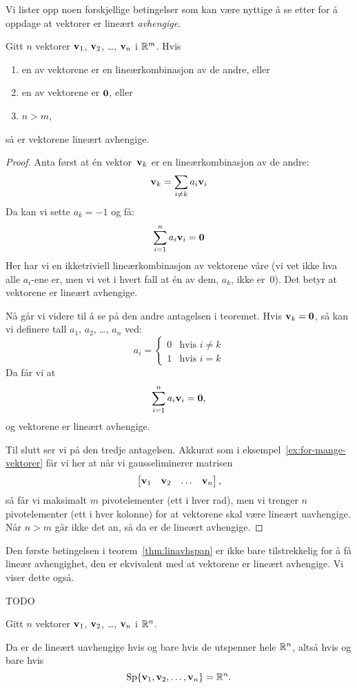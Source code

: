 Vi lister opp noen forskjellige betingelser som kan være nyttige å se
etter for å oppdage at vektorer er lineært \emph{avhengige}.

\begin{thm}
\label{thm:linavhspan}
Gitt $n$ vektorer  $\mathbf{v}_1$, $\mathbf{v}_2$, \ldots, $\mathbf{v}_n$ i $\mathbb{R}^m$.  Hvis
\begin{enumerate}
\item en av vektorene er en lineærkombinasjon av de andre, eller
\item en av vektorene er $\mathbf{0}$, eller
\item $n > m$,
\end{enumerate}
så er vektorene lineært avhengige.
\end{thm}
\begin{proof}
Anta først at én vektor~$\mathbf{v}_k$ er en lineærkombinasjon av de andre:
\[
\mathbf{v}_k = \sum_{i \ne k} a_i \mathbf{v}_i
\]
Da kan vi sette $a_k = -1$ og få:
\[
\sum_{i = 1}^n a_i \mathbf{v}_i = \mathbf{0}
\]
Her har vi en ikketriviell lineærkombinasjon av vektorene våre (vi vet
ikke hva alle $a_i$-ene er, men vi vet i hvert fall at én av dem,
$a_k$, ikke er~$0$).  Det betyr at vektorene er lineært avhengige.

Nå går vi videre til å se på den andre antagelsen i teoremet.  Hvis
$\mathbf{v}_k = \mathbf{0}$, så kan vi definere tall $a_1$, $a_2$, \ldots, $a_n$
ved:
\[
a_i =
\begin{cases}
0 & \text{hvis $i \ne k$} \\
1 & \text{hvis $i = k$}
\end{cases}
\]
Da får vi at
\[
\sum_{i = 1}^n a_i \mathbf{v}_i = \mathbf{0},
\]
og vektorene er lineært avhengige.

Til slutt ser vi på den tredje antagelsen.  Akkurat som i
eksempel~\ref{ex:for-mange-vektorer} får vi her at når vi
gausseliminerer matrisen
\[
\begin{bmatrix} \mathbf{v}_1 & \mathbf{v}_2 & \ldots & \mathbf{v}_n \end{bmatrix},
\]
så får vi maksimalt $m$ pivotelementer (ett i hver rad), men vi
trenger $n$ pivotelementer (ett i hver kolonne) for at vektorene skal
være lineært uavhengige.  Når $n > m$ går ikke det an, så da er de
lineært avhengige.
\end{proof}

Den første betingelsen i teorem~\ref{thm:linavhspan} er ikke bare
tilstrekkelig for å få lineær avhengighet, den er ekvivalent med at
vektorene er lineært avhengige.  Vi viser dette også.

\begin{thm}
TODO
\end{thm}


\begin{thm}
\label{thm:linuavhspan}
Gitt $n$ vektorer $\mathbf{v}_1$, $\mathbf{v}_2$, \ldots, $\mathbf{v}_n$ i $\mathbb{R}^n$.

Da er de lineært uavhengige hvis og bare hvis de utspenner hele $\mathbb{R}^n$,
altså hvis og bare hvis
\[
\operatorname{Sp} \{ \mathbf{v}_1, \mathbf{v}_2, \ldots, \mathbf{v}_n \} = \mathbb{R}^n.
\]
\end{thm}




\kapittelslutt
